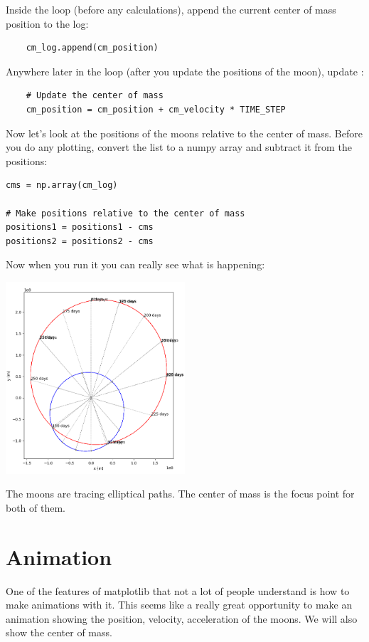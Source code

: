 Inside the loop (before any calculations),  append the current center of mass position to the log:

\begin{verbatim}
    cm_log.append(cm_position)
\end{verbatim}

Anywhere later in the loop (after you update the positions of the moon),  update :

\begin{verbatim}
    # Update the center of mass
    cm_position = cm_position + cm_velocity * TIME_STEP
\end{verbatim}

Now let's look at the positions of the moons relative to the center of mass.   Before you do any plotting,  
convert the list to a numpy array and subtract it from the positions:

\begin{verbatim}
cms = np.array(cm_log)

# Make positions relative to the center of mass
positions1 = positions1 - cms
positions2 = positions2 - cms
\end{verbatim}

Now when you run it you can really see what is happening:

\includegraphics[width=0.5\textwidth]{plotmoons_04.png}

The moons are tracing elliptical paths.  The center of mass is the focus point for both of them.

\section{Animation}

One of the features of matplotlib that not a lot of people understand is how to make animations with it.  This
seems like a really great opportunity to make an animation showing the position, velocity, acceleration of the moons.  We will also show the center of mass.

